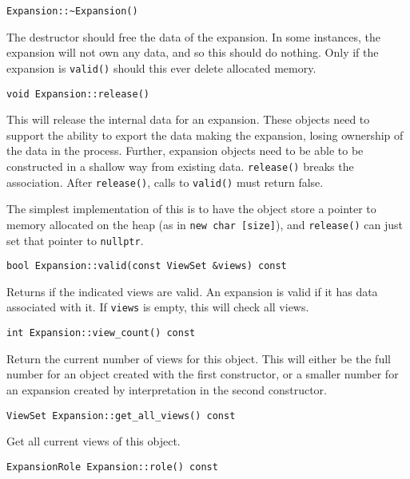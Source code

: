 \begin{lstlisting}
Expansion::~Expansion()
\end{lstlisting}

\noindent The destructor should free the data of the expansion. In some
instances, the expansion will not own any data, and so this should do nothing.
Only if the expansion is \texttt{valid()} should this ever delete allocated
memory.

\begin{lstlisting}
void Expansion::release()
\end{lstlisting}

\noindent This will release the internal data for an expansion. These objects
need to support the ability to export the data making the expansion, losing
ownership of the data in the process. Further, expansion objects need to be
able to be constructed in a shallow way from existing data. \texttt{release()}
breaks the association. After \texttt{release()}, calls to \texttt{valid()}
must return false.

The simplest implementation of this is to have the object store a pointer to
memory allocated on the heap (as in \texttt{new char [size]}), and
\texttt{release()} can just set that pointer to \texttt{nullptr}.

\begin{lstlisting}
bool Expansion::valid(const ViewSet &views) const
\end{lstlisting}

\noindent Returns if the indicated views are valid. An expansion is valid if it
has data associated with it. If \texttt{views} is empty, this will check all
views.

\begin{lstlisting}
int Expansion::view_count() const
\end{lstlisting}

\noindent Return the current number of views for this object. This will either
be the full number for an object created with the first constructor, or a
smaller number for an expansion created by interpretation in the second
constructor.

\begin{lstlisting}
ViewSet Expansion::get_all_views() const
\end{lstlisting}

\noindent Get all current views of this object.

\begin{lstlisting}
ExpansionRole Expansion::role() const
\end{lstlisting}

